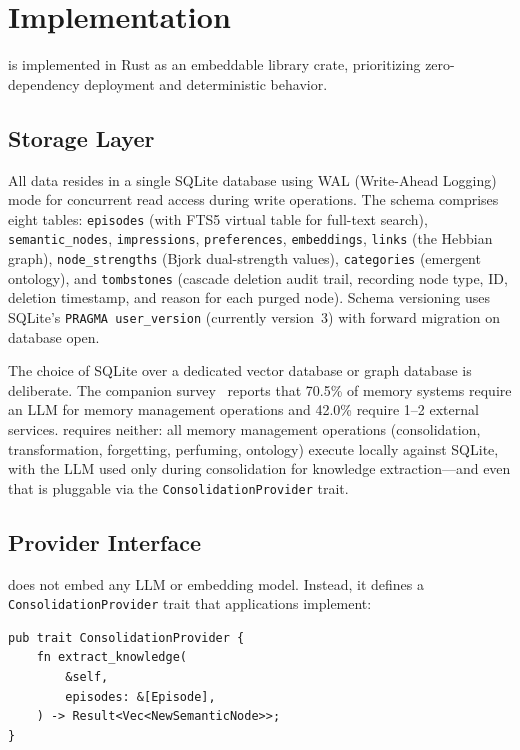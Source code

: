 \section{Implementation}
\label{sec:implementation}

\alaya{} is implemented in Rust as an embeddable library crate, prioritizing
zero-dependency deployment and deterministic behavior.

\subsection{Storage Layer}

All data resides in a single SQLite database using WAL (Write-Ahead Logging)
mode for concurrent read access during write operations. The schema comprises
eight tables: \texttt{episodes} (with FTS5 virtual table for full-text
search), \texttt{semantic\_nodes}, \texttt{impressions},
\texttt{preferences}, \texttt{embeddings}, \texttt{links} (the Hebbian
graph), \texttt{node\_strengths} (Bjork dual-strength values),
\texttt{categories} (emergent ontology), and \texttt{tombstones} (cascade
deletion audit trail, recording node type, ID, deletion timestamp, and
reason for each purged node). Schema versioning uses SQLite's
\texttt{PRAGMA user\_version} (currently version~3) with forward migration
on database open.

The choice of SQLite over a dedicated vector database or graph database is
deliberate. The companion survey~\cite{hui2026taxonomy} reports that 70.5\%
of memory systems require an LLM for memory management operations and 42.0\%
require 1--2 external services. \alaya{} requires neither: all memory
management operations (consolidation, transformation, forgetting,
perfuming, ontology) execute locally against SQLite, with the LLM used only
during consolidation for knowledge extraction---and even that is pluggable
via the \texttt{ConsolidationProvider} trait.

\subsection{Provider Interface}

\alaya{} does not embed any LLM or embedding model. Instead, it defines a
\texttt{ConsolidationProvider} trait that applications implement:

\begin{lstlisting}[caption={Provider trait (simplified)}]
pub trait ConsolidationProvider {
    fn extract_knowledge(
        &self,
        episodes: &[Episode],
    ) -> Result<Vec<NewSemanticNode>>;
}
\end{lstlisting}

